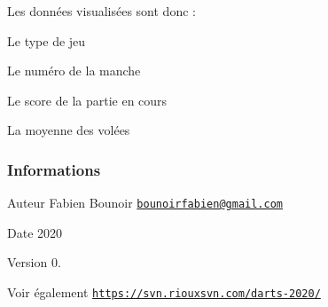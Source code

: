 Les données visualisées sont donc \+:


\begin{DoxyItemize}
\item Le type de jeu
\item Le numéro de la manche
\item Le score de la partie en cours
\item La moyenne des volées
\end{DoxyItemize}\hypertarget{page__r_e_a_d_m_e_informations}{}\subsubsection{Informations}\label{page__r_e_a_d_m_e_informations}
\begin{DoxyAuthor}{Auteur}
Fabien Bounoir \href{mailto:bounoirfabien@gmail.com}{\tt bounoirfabien@gmail.\+com} 
\end{DoxyAuthor}
\begin{DoxyDate}{Date}
2020 
\end{DoxyDate}
\begin{DoxyVersion}{Version}
0. 
\end{DoxyVersion}
\begin{DoxySeeAlso}{Voir également}
\href{https://svn.riouxsvn.com/darts-2020/}{\tt https\+://svn.\+riouxsvn.\+com/darts-\/2020/} 
\end{DoxySeeAlso}
